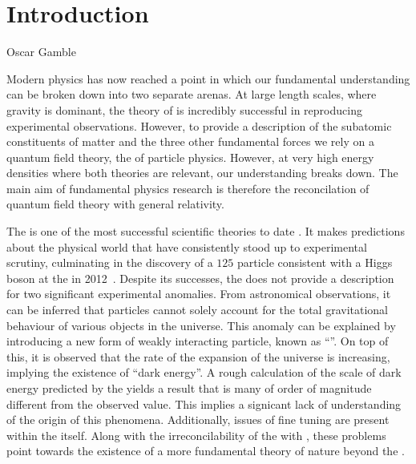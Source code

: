 \chapter{Introduction}
\label{chap:introduction}



%
{Oscar Gamble}


Modern physics has now reached a point in which our fundamental
understanding can be broken down into two separate arenas. At large
length scales, where gravity is dominant, the theory of \GR is incredibly successful in reproducing experimental
observations.  However, to provide a description of the subatomic
constituents of matter and the three other fundamental forces we rely
on a quantum field theory, the \SM of particle
physics. However, at very high energy densities where both theories
are relevant, our understanding breaks down. The main aim of
fundamental physics research is therefore the reconcilation of quantum
field theory with general relativity.
  
The \SM is one of the most successful scientific theories to date
\cite{Salam:1964ry,Glashow:1961tr,PhysRevLett.19.1264}. It makes
predictions about the physical world that have consistently stood up
to experimental scrutiny, culminating in the discovery of a $125$\gev
particle consistent with a Higgs boson at the \LHC in 2012~\cite{1207.7214,1207.7235}.  Despite
its successes, the \SM does not provide a description for two
significant experimental anomalies. From astronomical observations,
it can be inferred that \SM particles cannot solely account for the
total gravitational behaviour of various objects in the universe. This
anomaly can be explained by introducing a new form of weakly
interacting particle, known as ``\DM''. On top of this, it is
observed that the rate of the expansion of the universe is increasing,
implying the existence of ``dark energy''. A rough calculation of the
scale of dark energy predicted by the \SM yields a result that is many
of order of magnitude different from the observed value. This implies
a signicant lack of understanding of the origin of this phenomena.
Additionally, issues of fine tuning are present within the \SM itself.
Along with the irreconcilability of the \SM with \GR, these problems
point towards the existence of a more fundamental theory of nature
beyond the \SM.

